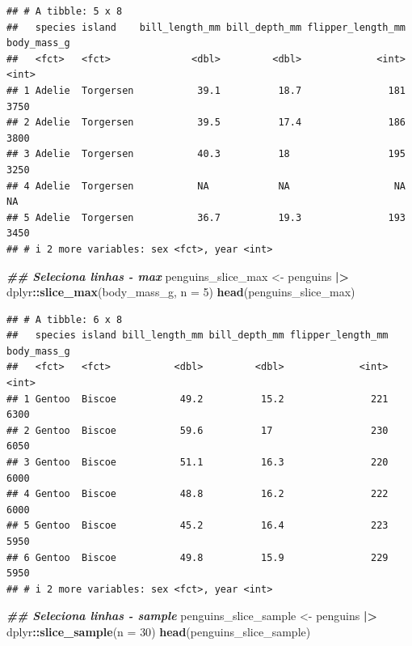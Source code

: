 \documentclass[
]{article}
\newenvironment{Shaded}{\begin{snugshade}}{\end{snugshade}}
\newcommand{\AttributeTok}[1]{\textcolor[rgb]{0.13,0.29,0.53}{#1}}
\newcommand{\DecValTok}[1]{\textcolor[rgb]{0.00,0.00,0.81}{#1}}
\newcommand{\DocumentationTok}[1]{\textcolor[rgb]{0.56,0.35,0.01}{\textbf{\textit{#1}}}}
\newcommand{\FunctionTok}[1]{\textcolor[rgb]{0.13,0.29,0.53}{\textbf{#1}}}
\newcommand{\NormalTok}[1]{#1}
\newcommand{\OtherTok}[1]{\textcolor[rgb]{0.56,0.35,0.01}{#1}}
\newcommand{\SpecialCharTok}[1]{\textcolor[rgb]{0.81,0.36,0.00}{\textbf{#1}}}
\begin{document}
\begin{verbatim}
## # A tibble: 5 x 8
##   species island    bill_length_mm bill_depth_mm flipper_length_mm body_mass_g
##   <fct>   <fct>              <dbl>         <dbl>             <int>       <int>
## 1 Adelie  Torgersen           39.1          18.7               181        3750
## 2 Adelie  Torgersen           39.5          17.4               186        3800
## 3 Adelie  Torgersen           40.3          18                 195        3250
## 4 Adelie  Torgersen           NA            NA                  NA          NA
## 5 Adelie  Torgersen           36.7          19.3               193        3450
## # i 2 more variables: sex <fct>, year <int>
\end{verbatim}

\begin{Shaded}
\begin{Highlighting}[]
\DocumentationTok{\#\# Seleciona linhas {-} max}
\NormalTok{penguins\_slice\_max }\OtherTok{\textless{}{-}}\NormalTok{ penguins }\SpecialCharTok{|\textgreater{}} 
\NormalTok{    dplyr}\SpecialCharTok{::}\FunctionTok{slice\_max}\NormalTok{(body\_mass\_g, }\AttributeTok{n =} \DecValTok{5}\NormalTok{)}
\FunctionTok{head}\NormalTok{(penguins\_slice\_max)}
\end{Highlighting}
\end{Shaded}

\begin{verbatim}
## # A tibble: 6 x 8
##   species island bill_length_mm bill_depth_mm flipper_length_mm body_mass_g
##   <fct>   <fct>           <dbl>         <dbl>             <int>       <int>
## 1 Gentoo  Biscoe           49.2          15.2               221        6300
## 2 Gentoo  Biscoe           59.6          17                 230        6050
## 3 Gentoo  Biscoe           51.1          16.3               220        6000
## 4 Gentoo  Biscoe           48.8          16.2               222        6000
## 5 Gentoo  Biscoe           45.2          16.4               223        5950
## 6 Gentoo  Biscoe           49.8          15.9               229        5950
## # i 2 more variables: sex <fct>, year <int>
\end{verbatim}

\begin{Shaded}
\begin{Highlighting}[]
\DocumentationTok{\#\# Seleciona linhas {-} sample}
\NormalTok{penguins\_slice\_sample }\OtherTok{\textless{}{-}}\NormalTok{ penguins }\SpecialCharTok{|\textgreater{}} 
\NormalTok{    dplyr}\SpecialCharTok{::}\FunctionTok{slice\_sample}\NormalTok{(}\AttributeTok{n =} \DecValTok{30}\NormalTok{)}
\FunctionTok{head}\NormalTok{(penguins\_slice\_sample)}
\end{Highlighting}
\end{Shaded}
\end{document}
